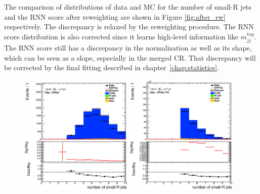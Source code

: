 The comparison of distributions of data and MC for the number of small-R jets and 
the RNN score after reweighting are shown in Figure \ref{fig:after_rw}
respectively. The discrepancy is relaxed by the reweighting procedure. %
The RNN score distribution is also corrected since it learns high-level information like $m^{tag}_{jj}$.
The RNN score still has a discrepancy in the normalization as well as its shape, which can be seen as a slope, especially in the merged CR.
That discrepancy will be corrected by the final fitting described in chapter~\ref{chap:statistics}.
\begin{figure}[ht]
    \centering
    \includegraphics[width=0.48\textwidth]{figures/2lep/reweighting/after_reweighting/C_0ptag1pfat0pjet_0ptv_CRVjet_NJets_Lin.eps}
    \includegraphics[width=0.48\textwidth]{figures/2lep/reweighting/after_reweighting/C_0ptag2pjet_0ptv_CRVjet_Fid_NJets_Lin.eps}

\end{figure}

